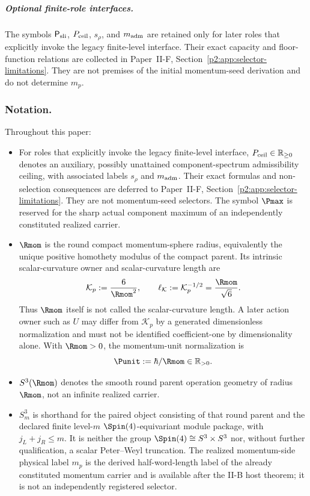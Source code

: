 \documentclass[12pt,a4paper]{article}
\begin{document}
\subparagraph{Optional finite-role interfaces.}
The symbols \(\mathsf P_{\rm sli}\), \(P_{\rm ceil}\), \(s_\rho\), and
\(m_{\rm adm}\) are retained only for later roles that explicitly invoke the
legacy finite-level interface.  Their exact capacity and floor-function
relations are collected in Paper~II-F, Section~\ref{p2:app:selector-limitations}.  They
are not premises of the initial momentum-seed derivation and do not determine
\(m_p\).

\subsubsection{Notation.}
Throughout this paper:
\begin{itemize}
    \item For roles that explicitly invoke the legacy finite-level interface,
    \(P_{\rm ceil}\in\mathbb R_{\ge0}\) denotes an auxiliary, possibly
    unattained component-spectrum admissibility ceiling, with associated labels
    \(s_\rho\) and \(m_{\rm adm}\).  Their exact formulas and non-selection
    consequences are deferred to Paper~II-F, Section~\ref{p2:app:selector-limitations}.
    They are not momentum-seed selectors.  The symbol \(\Pmax\) is reserved
    for the sharp actual component maximum of an independently constituted
    realized carrier.

    \item \(\Rmom\) is the round compact momentum-sphere radius, equivalently
    the unique positive homothety modulus of the compact parent.  Its intrinsic
    scalar-curvature owner and scalar-curvature length are
    \[
        \mathcal K_p:=\frac6{\Rmom^2},\qquad
        \ell_{\mathcal K}:=\mathcal K_p^{-1/2}=\frac{\Rmom}{\sqrt6}.
    \]
    Thus \(\Rmom\) itself is not called the scalar-curvature length.  A later
    action owner such as \(U\) may differ from \(\mathcal K_p\) by a generated
    dimensionless normalization and must not be identified coefficient-one by
    dimensionality alone.  With \(\Rmom>0\), the momentum-unit normalization is
    \[
        \Punit := \hbar/\Rmom\in\mathbb R_{>0}.
    \]

    \item \(S^3(\Rmom)\) denotes the smooth round parent operation
    geometry of radius \(\Rmom\), not an infinite realized carrier.

    \item \(S^3_m\) is shorthand for the paired object consisting of that
    round parent and the declared finite level-\(m\)
    \(\Spin(4)\)-equivariant module package, with \(j_L+j_R\leq m\).  It is
    neither the group \(\Spin(4)\cong S^3\times S^3\) nor, without further
    qualification, a scalar Peter--Weyl truncation.  The realized momentum-side physical label \(m_p\) is the derived
    half-word-length label of the already constituted momentum carrier and is
    available after the II-B host theorem; it is not an independently
    registered selector.


\end{itemize}
\end{document}
